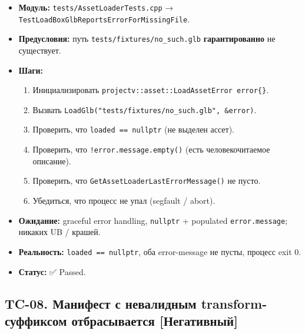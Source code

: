\begin{itemize}
\tightlist
\item
  \textbf{Модуль:} \texttt{tests/AssetLoaderTests.cpp} → \texttt{TestLoadBoxGlbReportsErrorForMissingFile}.
\item
  \textbf{Предусловия:} путь \texttt{tests/fixtures/no\_such.glb} \textbf{гарантированно} не существует.
\item
  \textbf{Шаги:}

  \begin{enumerate}
  \def\labelenumi{\arabic{enumi}.}
  \tightlist
  \item
    Инициализировать \texttt{projectv::asset::LoadAssetError\ error\{\}}.
  \item
    Вызвать \texttt{LoadGlb("tests/fixtures/no\_such.glb",\ \&error)}.
  \item
    Проверить, что \texttt{loaded\ ==\ nullptr} (не выделен ассет).
  \item
    Проверить, что \texttt{!error.message.empty()} (есть человекочитаемое описание).
  \item
    Проверить, что \texttt{GetAssetLoaderLastErrorMessage()} не пусто.
  \item
    Убедиться, что процесс не упал (segfault / abort).
  \end{enumerate}
\item
  \textbf{Ожидание:} graceful error handling, \texttt{nullptr} + populated \texttt{error.message}; никаких UB / крашей.
\item
  \textbf{Реальность:} \texttt{loaded\ ==\ nullptr}, оба error-message не пусты, процесс exit 0.
\item
  \textbf{Статус:} ✅ Passed.
\end{itemize}

\subsection{TC-08. Манифест с невалидным transform-суффиксом отбрасывается {[}Негативный{]}}\label{KT-2.2_Test_Report-tc-08-ux43cux430ux43dux438ux444ux435ux441ux442-ux441-ux43dux435ux432ux430ux43bux438ux434ux43dux44bux43c-transform-ux441ux443ux444ux444ux438ux43aux441ux43eux43c-ux43eux442ux431ux440ux430ux441ux44bux432ux430ux435ux442ux441ux44f-ux43dux435ux433ux430ux442ux438ux432ux43dux44bux439}

